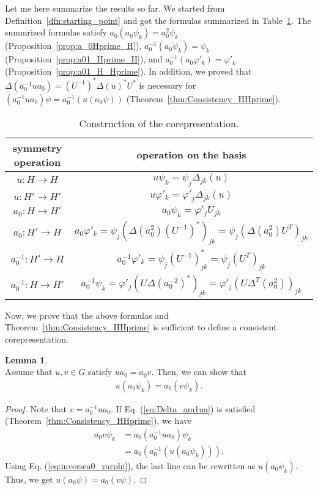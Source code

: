 \documentclass{article}
\theoremstyle{definition}
\newtheorem{lem}[dfn]{Lemma}
\begin{document}
Let me here summarize the results so far.
We started from Definition~\ref{dfn:starting_point} and got the formulas summarized in Table~\ref{table:operations_and_corep}.
The summrized formulas satisfy $a_0(a_0 \psi_k) = a_0^2 \psi_k$ (Proposition~\ref{prop:a_0Hprime_H}), 
$a_0^{-1} (a_0 \psi_k) = \psi_k$ (Proposition~\ref{prop:a01_Hprime_H}), and   $a_0^{-1} (a_0 \varphi'_k) = \varphi'_k$ (Proposition~\ref{prop:a01_H_Hprime}).
In addition, we proved that $\Delta(a_0^{-1} u a_0) = (U^{-1})^* \Delta(u)^* U^*$ is necessary for $(a_0^{-1} u a_0 ) \psi = a_0^{-1}(u (a_0 \psi))$ (Theorem~\ref{thm:Consistency_HHprime}).
\begin{table}[H]
  \label{table:operations_and_corep}
  \begin{center}
    \caption{Construction of the corepresentation.} 
\begin{tabular}{c|c}
  symmetry operation & operation on the basis \\
  \hline
  $u: H\to H$ & $u \psi_k = \psi_j \Delta_{jk} (u)$ \\
  $u: H'\to H'$ & $u \varphi'_k = \varphi'_j \Delta_{jk}(u)$ \\
  $a_0: H \to H'$ & $a_0 \psi_k = \varphi'_j U_{jk}$\\
  $a_0: H' \to H$ & $a_0 \varphi'_k = \psi_j (\Delta (a_0^2) (U^{-1})^*)_{jk} = \psi_j (\Delta (a_0^2) U^{T})_{jk}$\\
  $a_0^{-1}: H' \to H$ & $a_0^{-1} \varphi'_k = \psi_j (U^{-1})^*_{jk} = \psi_j (U^{T})_{jk}$\\
  $a_0^{-1}: H \to H'$ & $a_0^{-1} \psi_k = \varphi'_j (U \Delta(a_0^{-2})^*)_{jk} = \varphi'_j (U \Delta^T(a_0^{2}))_{jk}$
 \end{tabular}
\end{center}
\end{table}

Now, we prove that the above formulas and Theorem~\ref{thm:Consistency_HHprime} is sufficient to define a consistent corepresentation.

\begin{lem}~\\
  Assume that $u,v \in G$ satisfy $u a_0 = a_0 v$. Then, we can show that
  \begin{align}
    u (a_0 \psi_k) = a_0 (v \psi_k).
  \end{align}
\end{lem}

\begin{proof}
  Note that $v = a_0^{-1} u a_0$. If Eq. (\ref{eq:Delta_am1ua}) is satisfied (Theorem~\ref{thm:Consistency_HHprime}), we have
  \begin{align}
    a_0 v \psi_k 
    &= 
    a_0 (a_0^{-1} u a_0)\psi_k
    \nonumber
    \\&=
    a_0 (a_0^{-1} (u (a_0\psi_k))).
  \end{align}
  Using Eq. (\ref{eq:inversea0_varphi}), the last line can be rewritten as $u (a_0\psi_k)$. Thus, we get $u (a_0 \psi) = a_0 (v \psi)$.
\end{proof}
 
\end{document}
